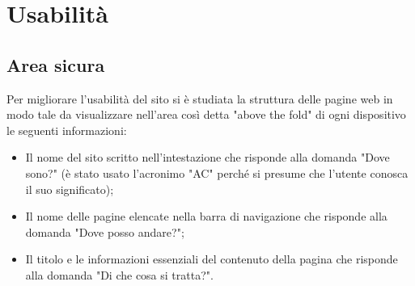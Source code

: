 \section{Usabilità}
    \subsection{Area sicura}
    Per migliorare l'usabilità del sito si è studiata la struttura delle pagine web in modo tale da visualizzare nell'area così detta "above the fold" di ogni dispositivo le seguenti informazioni:
    \begin{itemize}
        \item Il nome del sito scritto nell'intestazione che risponde alla domanda "Dove sono?" (è stato usato l'acronimo "AC" perché si presume che l'utente conosca il suo significato);
        \item Il nome delle pagine elencate nella barra di navigazione che risponde alla domanda "Dove posso andare?";
        \item Il titolo e le informazioni essenziali del contenuto della pagina che risponde alla domanda "Di che cosa si tratta?".
    \end{itemize}
    
